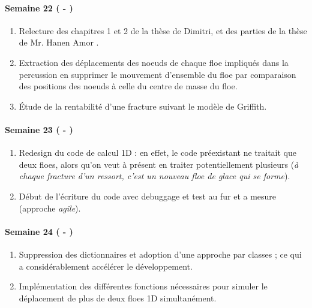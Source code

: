 \paragraph{Semaine 22 ( - )} 
\begin{enumerate}
    \item Relecture des chapitres 1 et 2 de la thèse de Dimitri, et des parties de la thèse de Mr. Hanen Amor \parencite{amor2008approche}. 
    \item Extraction des déplacements des noeuds de chaque floe impliqués dans la percussion en supprimer le mouvement d'ensemble du floe par comparaison des positions des noeuds à celle du centre de masse du floe.
    \item Étude de la rentabilité d'une fracture suivant le modèle de Griffith.
\end{enumerate}
  
  
\paragraph{Semaine 23 ( - )} 
\begin{enumerate}
    \item Redesign du code de calcul 1D : en effet, le code préexistant ne traitait que deux floes, alors qu'on veut à présent en traiter potentiellement plusieurs (\emph{à chaque fracture d'un ressort, c'est un nouveau floe de glace qui se forme}).
    \item Début de l'écriture du code avec debuggage et test au fur et a mesure (approche \emph{agile}).
\end{enumerate}


\paragraph{Semaine 24 ( - )} 
\begin{enumerate}
    \item Suppression des dictionnaires et adoption d'une approche par classes ; ce qui a considérablement accélérer le développement.
    \item Implémentation des différentes fonctions nécessaires pour simuler le déplacement de plus de deux floes 1D simultanément.
\end{enumerate}
  
